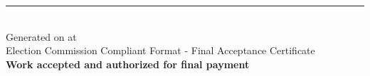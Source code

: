 \documentclass[12pt,a4paper]{article}
\begin{document}
\vspace{1cm}
\begin{center}
\rule{\textwidth}{1pt}\\
\small
Generated on  at \\
Election Commission Compliant Format - Final Acceptance Certificate\\
\textcolor{finalgreen}{\textbf{Work accepted and authorized for final payment}}
\end{center}
\end{document}
